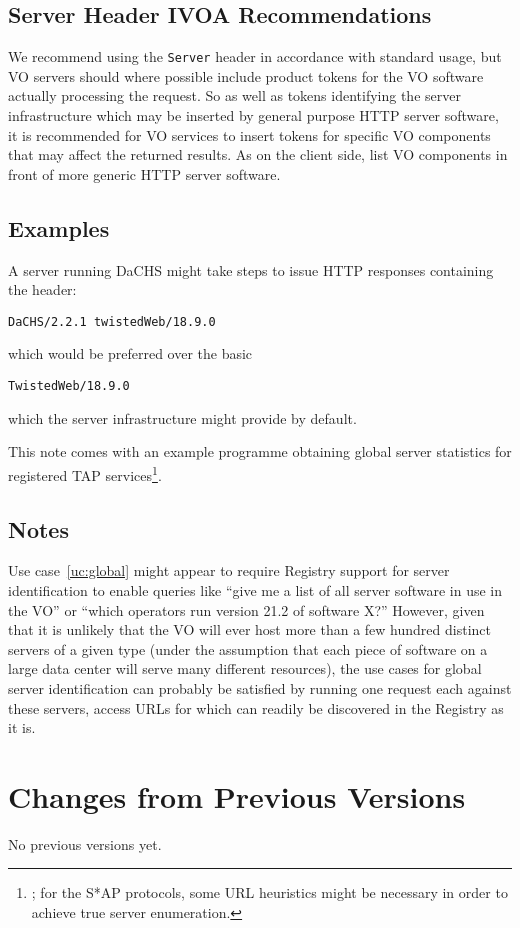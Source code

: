 \documentclass[11pt,a4paper]{ivoa}
\newcommand{\headername}[1]{{\tt #1}}
\begin{document}
\subsection{Server Header IVOA Recommendations}

We recommend using the \headername{Server} header
in accordance with standard usage,
but VO servers should where possible include product tokens
for the VO software actually processing the request.
So as well as tokens identifying the server infrastructure which
may be inserted by general purpose HTTP server software,
it is recommended for VO services to insert tokens for specific
VO components that may affect the returned results.
As on the client side, list VO components in front of
more generic HTTP server software.

\subsection{Examples}

A server running DaCHS might take steps to issue HTTP responses
containing the header:
\begin{verbatim}
DaCHS/2.2.1 twistedWeb/18.9.0
\end{verbatim}
which would be preferred over the basic
\begin{verbatim}
TwistedWeb/18.9.0
\end{verbatim}
which the server infrastructure might provide by default.

This note comes with an example programme obtaining global server
statistics for registered TAP
services\footnote{; for the S*AP protocols,
some URL heuristics might be necessary in order to achieve true server
enumeration.}.

\subsection{Notes}

Use case~\ref{uc:global} might appear to require Registry support for
server identification to enable queries like ``give me a list of all
server software in use in the VO'' or ``which operators run version 21.2
of software X?''  However, given that it is unlikely that the VO will
ever host more than a few hundred distinct servers of a given type
(under the assumption that each piece of software on a large data center
will serve many different resources), the use cases for global server
identification can probably be satisfied by running one request each
against these servers, access URLs for which can readily be discovered
in the Registry as it is.  

\appendix
\section{Changes from Previous Versions}

No previous versions yet.  



\end{document}
